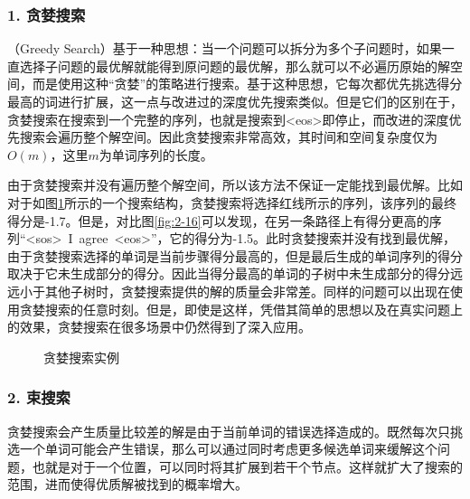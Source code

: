 
\subsubsection{1. 贪婪搜索}

（Greedy Search）基于一种思想：当一个问题可以拆分为多个子问题时，如果一直选择子问题的最优解就能得到原问题的最优解，那么就可以不必遍历原始的解空间，而是使用这种“贪婪”的策略进行搜索。基于这种思想，它每次都优先挑选得分最高的词进行扩展，这一点与改进过的深度优先搜索类似。但是它们的区别在于，贪婪搜索在搜索到一个完整的序列，也就是搜索到<eos>即停止，而改进的深度优先搜索会遍历整个解空间。因此贪婪搜索非常高效，其时间和空间复杂度仅为$O(m)$，这里$m$为单词序列的长度。

\parinterval 由于贪婪搜索并没有遍历整个解空间，所以该方法不保证一定能找到最优解。比如对于如图\ref{fig:2-18}所示的一个搜索结构，贪婪搜索将选择红线所示的序列，该序列的最终得分是-1.7。但是，对比图\ref{fig:2-16}可以发现，在另一条路径上有得分更高的序列“<sos>\ I\ agree\ <eos>”，它的得分为-1.5。此时贪婪搜索并没有找到最优解，由于贪婪搜索选择的单词是当前步骤得分最高的，但是最后生成的单词序列的得分取决于它未生成部分的得分。因此当得分最高的单词的子树中未生成部分的得分远远小于其他子树时，贪婪搜索提供的解的质量会非常差。同样的问题可以出现在使用贪婪搜索的任意时刻。但是，即使是这样，凭借其简单的思想以及在真实问题上的效果，贪婪搜索在很多场景中仍然得到了深入应用。

\begin{figure}[htp]
    \centering
 	
	\caption{贪婪搜索实例}
    \label{fig:2-18}
\end{figure}


\subsubsection{2. 束搜索}

\parinterval 贪婪搜索会产生质量比较差的解是由于当前单词的错误选择造成的。既然每次只挑选一个单词可能会产生错误，那么可以通过同时考虑更多候选单词来缓解这个问题，也就是对于一个位置，可以同时将其扩展到若干个节点。这样就扩大了搜索的范围，进而使得优质解被找到的概率增大。

